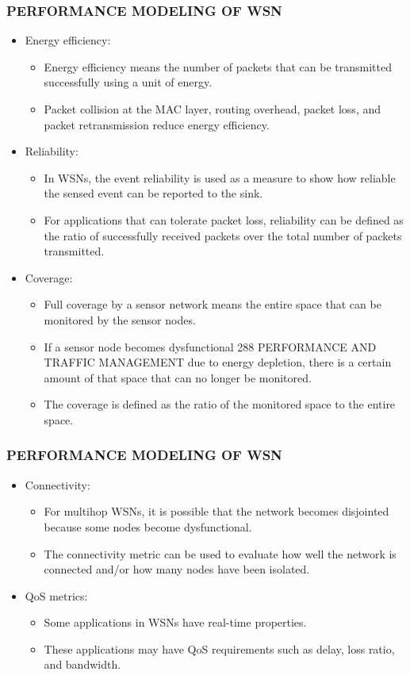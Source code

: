 \documentclass[11pt]{beamer}
\begin{document}
			\begin{frame}
				\frametitle{PERFORMANCE MODELING OF WSN}
				\begin{itemize}
					\item Energy efficiency:
					\begin{itemize}
						\item Energy efficiency means the number of packets that can be transmitted successfully using a unit of energy. 
						\item Packet collision at the MAC layer, routing overhead, packet loss, and packet retransmission reduce energy efficiency.
					\end{itemize}
					\item Reliability:
					\begin{itemize}
						\item In WSNs, the event reliability is used as a measure to show how reliable the sensed event can be reported to the sink. 
						\item For applications that can tolerate packet loss, reliability can be defined as the ratio of successfully received packets over the total number of packets transmitted.
					\end{itemize}
					\item Coverage:
					\begin{itemize}
					\item Full coverage by a sensor network means the entire space that can be monitored by the sensor nodes.
					\item If a sensor node becomes dysfunctional 288 PERFORMANCE AND TRAFFIC MANAGEMENT due to energy depletion, there is a certain amount of that space that can no longer be monitored. 
					\item The coverage is defined as the ratio of the monitored space to the entire space.
					\end{itemize}
				
				\end{itemize}
			\end{frame}
			\begin{frame}
			\frametitle{PERFORMANCE MODELING OF WSN}
			\begin{itemize}
				\item Connectivity:
				\begin{itemize}
					\item 
				For multihop WSNs, it is possible that the network becomes disjointed because some nodes become dysfunctional.
				\item The connectivity metric can be used to evaluate how well the network is connected and/or how many nodes have been isolated.
			\end{itemize}
				\item  QoS metrics:
				\begin{itemize}
					\item  
				Some applications in WSNs have real-time properties. 
				\item These applications may have QoS requirements such as delay, loss ratio, and bandwidth.
				\end{itemize}
				\end{itemize}
			\end{frame}
\end{document}
